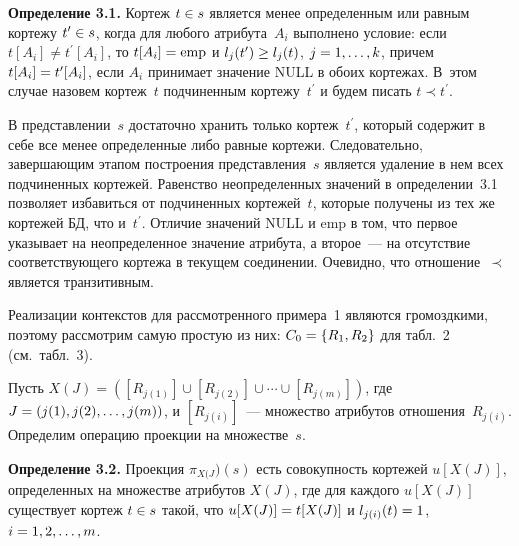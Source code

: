 \begin{multicols}{2}
  \noindent
  \textbf{Определение 3.1.} Кортеж $t\hm\in s$ является менее определенным 
или равным кортежу $t^\prime\hm\in s$, когда для любого атрибута~$A_i$ 
выполнено условие: если $t[A_i]\not= t^\prime[A_i]$, то $t[A_i]\hm=\mathrm{emp}$ и 
$l_j(t^\prime)\hm\geq l_j(t)$, $j\hm=1, \ldots ,k$, причем $t[A_i]\hm=t^\prime[A_i]$, 
если $A_i$ принимает значение NULL в обоих кортежах. В~этом случае 
назовем кортеж~$t$ подчиненным кортежу~$t^\prime$ и будем писать $t\prec 
t^\prime$.
  
  \smallskip
  
  В представлении~$s$ достаточно хранить только кортеж~$t^\prime$, который 
содержит в себе все менее определенные либо равные кортежи. Следовательно, 
завершающим этапом построения представления~$s$ является удаление в нем 
всех подчиненных кортежей. Равенство неопределенных значений в 
определении~3.1 позволяет избавиться от подчиненных кортежей~$t$, которые 
получены из тех же кортежей БД, что и~$t^\prime$. Отличие значений NULL 
и emp в том, что первое указывает на неопределенное значение атрибута, а 
второе~--- на отсутствие со\-от\-вет\-ст\-ву\-юще\-го кортежа в текущем соединении. 
Очевидно, что отношение~$\prec$ является транзитивным.
  
  Реализации контекстов для рассмотренного примера~1 являются 
громоздкими, поэтому рассмотрим самую простую из них: $C_0\hm=\{R_1, 
R_2\}$ для табл.~2 (см.\ табл.~3).
  

  
  Пусть $X(J)=([R_{j(1)}]\cup [R_{j(2)}]\cup\cdots \cup [R_{j(m)}])$, где $J\hm=(j(1), 
j(2), \ldots , j(m))$, и $[R_{j(i)}]$~--- множество атрибутов отношения~$R_{j(i)}$. 
Определим операцию проекции на множестве~$s$.
  
  \smallskip
  
  \noindent
  \textbf{Определение 3.2.} Проекция $\pi_{X(J})(s)$ есть совокупность 
кортежей $u[X(J)]$, определенных на множестве атрибутов $X(J)$, где для 
каждого $u[X(J)]$ существует кортеж $t\hm\in s$ такой, что $u[X(J)]\hm=t[X(J)]$ 
и $l_{j(i)}(t)\hm=1$, $i\hm=1,2, \ldots ,m$.
  
  \smallskip
  

\end{multicols}
